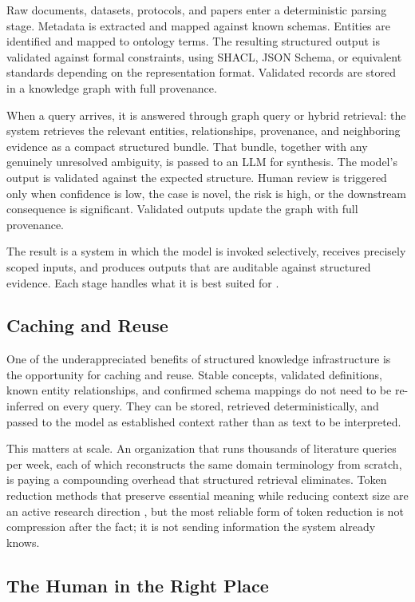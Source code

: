 \documentclass[man,12pt,donotrepeattitle]{apa7}
\begin{document}
Raw documents, datasets, protocols, and papers enter a deterministic parsing
stage. Metadata is extracted and mapped against known schemas. Entities are
identified and mapped to ontology terms. The resulting structured output is
validated against formal constraints, using SHACL, JSON Schema, or
equivalent standards depending on the representation format. Validated
records are stored in a knowledge graph with full provenance.

When a query arrives, it is answered through graph query or hybrid
retrieval: the system retrieves the relevant entities, relationships,
provenance, and neighboring evidence as a compact structured bundle. That
bundle, together with any genuinely unresolved ambiguity, is passed to an
LLM for synthesis. The model's output is validated against the expected
structure. Human review is triggered only when confidence is low, the case
is novel, the risk is high, or the downstream consequence is significant.
Validated outputs update the graph with full provenance.

The result is a system in which the model is invoked selectively, receives
precisely scoped inputs, and produces outputs that are auditable against
structured evidence. Each stage handles what it is best suited for
\parencite{ma2025}.

\subsection{Caching and Reuse}

One of the underappreciated benefits of structured knowledge infrastructure
is the opportunity for caching and reuse. Stable concepts, validated
definitions, known entity relationships, and confirmed schema mappings do
not need to be re-inferred on every query. They can be stored, retrieved
deterministically, and passed to the model as established context rather
than as text to be interpreted.

This matters at scale. An organization that runs thousands of literature
queries per week, each of which reconstructs the same domain terminology
from scratch, is paying a compounding overhead that structured retrieval
eliminates. Token reduction methods that preserve essential meaning while
reducing context size are an active research direction \parencite{trim2024},
but the most reliable form of token reduction is not compression after the
fact; it is not sending information the system already knows.

\subsection{The Human in the Right Place}
\end{document}
